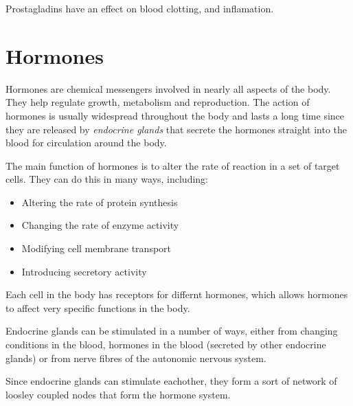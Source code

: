 \documentclass{article}
\begin{document}
Prostagladins have an effect on blood clotting, and inflamation.

\section*{Hormones}

Hormones are chemical messengers involved in nearly all aspects of the body.
They help regulate growth, metabolism and reproduction. The action of hormones
is usually widespread throughout the body and lasts a long time since they are
released by {\it endocrine glands} that secrete the hormones straight into the
blood for circulation around the body.

The main function of hormones is to alter the rate of reaction in a set of target cells. They can do this in many ways, including:

\begin{itemize}

	\item Altering the rate of protein synthesis
	\item Changing the rate of enzyme activity
	\item Modifying cell membrane transport
	\item Introducing secretory activity

\end{itemize}

Each cell in the body has receptors for differnt hormones, which allows hormones
to affect very specific functions in the body.

Endocrine glands can be stimulated in a number of ways, either from changing
conditions in the blood, hormones in the blood (secreted by other endocrine
glands) or from nerve fibres of the autonomic nervous system.

Since endocrine glands can stimulate eachother, they form a sort of network of
loosley coupled nodes that form the hormone system.
\end{document}
